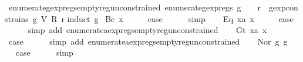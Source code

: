 \begin{isabellebody}
\isamarkupfalse%
%
\endisatagproof
{\isafoldproof}%
%
\isadelimproof
\isanewline
%
\endisadelimproof
\isanewline
{}\isamarkupfalse%
\ enumerate{\isacharunderscore}gexp{\isacharunderscore}regs{\isacharunderscore}empty{\isacharunderscore}reg{\isacharunderscore}unconstrained{\isacharcolon}\ {\isachardoublequoteopen}enumerate{\isacharunderscore}gexp{\isacharunderscore}regs\ g\ {\isacharequal}\ {\isacharbraceleft}{\isacharbraceright}\ {\isasymLongrightarrow}\ {\isasymforall}r{\isachardot}\ {\isasymnot}\ gexp{\isacharunderscore}constrains\ g\ {\isacharparenleft}V\ {\isacharparenleft}R\ r{\isacharparenright}{\isacharparenright}{\isachardoublequoteclose}\isanewline
%
\isadelimproof
%
\endisadelimproof
%
\isatagproof
{}\isamarkupfalse%
{\isacharparenleft}induct\ g{\isacharparenright}\isanewline
{}\isamarkupfalse%
\ {\isacharparenleft}Bc\ x{\isacharparenright}\isanewline
\ \ \isamarkupfalse%
\ \isamarkupfalse%
\ {\isacharquery}case\isanewline
\ \ \ \ \isamarkupfalse%
\ simp\isanewline
{}\isamarkupfalse%
\isanewline
\ \ \isamarkupfalse%
\ {\isacharparenleft}Eq\ x{}a\ x{}{\isacharparenright}\isanewline
\ \ \isamarkupfalse%
\ \isamarkupfalse%
\ {\isacharquery}case\isanewline
\ \ \ \ \isamarkupfalse%
\ {\isacharparenleft}simp\ add{\isacharcolon}\ enumerate{\isacharunderscore}aexp{\isacharunderscore}regs{\isacharunderscore}empty{\isacharunderscore}reg{\isacharunderscore}unconstrained{\isacharparenright}\isanewline
{}\isamarkupfalse%
\isanewline
\ \ \isamarkupfalse%
\ {\isacharparenleft}Gt\ x{}a\ x{}{\isacharparenright}\isanewline
\ \ \isamarkupfalse%
\ \isamarkupfalse%
\ {\isacharquery}case\isanewline
\ \ \ \ \isamarkupfalse%
\ {\isacharparenleft}simp\ add{\isacharcolon}\ enumerate{\isacharunderscore}aexp{\isacharunderscore}regs{\isacharunderscore}empty{\isacharunderscore}reg{\isacharunderscore}unconstrained{\isacharparenright}\isanewline
{}\isamarkupfalse%
\isanewline
\ \ \isamarkupfalse%
\ {\isacharparenleft}Nor\ g{}\ g{}{\isacharparenright}\isanewline
\ \ \isamarkupfalse%
\ \isamarkupfalse%
\ {\isacharquery}case\isanewline
\ \ \ \ \isamarkupfalse%
\ simp\isanewline
{}\isamarkupfalse%
\isanewline
\ \ \isamarkupfalse%

\end{isabellebody}
